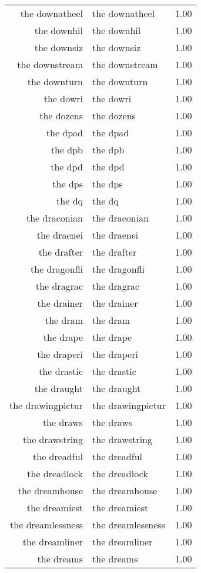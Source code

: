 \begin{table}[ht]
\begin{tabular}{rlr}
  the downatheel & the downatheel & 1.00 \\ 
  the downhil & the downhil & 1.00 \\ 
  the downsiz & the downsiz & 1.00 \\ 
  the downstream & the downstream & 1.00 \\ 
  the downturn & the downturn & 1.00 \\ 
  the dowri & the dowri & 1.00 \\ 
  the dozens & the dozens & 1.00 \\ 
  the dpad & the dpad & 1.00 \\ 
  the dpb & the dpb & 1.00 \\ 
  the dpd & the dpd & 1.00 \\ 
  the dps & the dps & 1.00 \\ 
  the dq & the dq & 1.00 \\ 
  the draconian & the draconian & 1.00 \\ 
  the draenei & the draenei & 1.00 \\ 
  the drafter & the drafter & 1.00 \\ 
  the dragonfli & the dragonfli & 1.00 \\ 
  the dragrac & the dragrac & 1.00 \\ 
  the drainer & the drainer & 1.00 \\ 
  the dram & the dram & 1.00 \\ 
  the drape & the drape & 1.00 \\ 
  the draperi & the draperi & 1.00 \\ 
  the drastic & the drastic & 1.00 \\ 
  the draught & the draught & 1.00 \\ 
  the drawingpictur & the drawingpictur & 1.00 \\ 
  the draws & the draws & 1.00 \\ 
  the drawstring & the drawstring & 1.00 \\ 
  the dreadful & the dreadful & 1.00 \\ 
  the dreadlock & the dreadlock & 1.00 \\ 
  the dreamhouse & the dreamhouse & 1.00 \\ 
  the dreamiest & the dreamiest & 1.00 \\ 
  the dreamlessness & the dreamlessness & 1.00 \\ 
  the dreamliner & the dreamliner & 1.00 \\ 
  the dreams & the dreams & 1.00 \\ 

\end{tabular}
\end{table}
